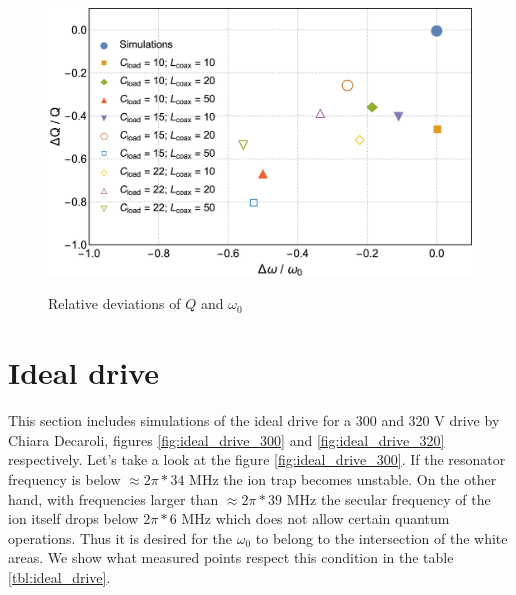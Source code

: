 \begin{figure}[h]
	\centering
	\includegraphics[width=\textwidth]{images/Q_w_plot}
	\label{fig:Q_w_deviation}
	\caption{Relative deviations of $Q$ and $\omega_0$}
\end{figure}

\section{Ideal drive}
\label{section:ideal_drive}
This section includes simulations of the ideal drive for a 300 and 320 V drive by Chiara Decaroli, figures \ref{fig:ideal_drive_300} and \ref{fig:ideal_drive_320} respectively. Let's take a look at the figure \ref{fig:ideal_drive_300}. If the resonator frequency is below $\approx 2\pi*34$ MHz the ion trap becomes unstable. On the other hand, with frequencies larger than $\approx 2\pi*39$ MHz the secular frequency of the ion itself drops below $2\pi*6$ MHz which does not allow certain quantum operations. Thus it is desired for the $\omega_0$ to belong to the intersection of the white areas. We show what measured points respect this condition in the table \ref{tbl:ideal_drive}.

